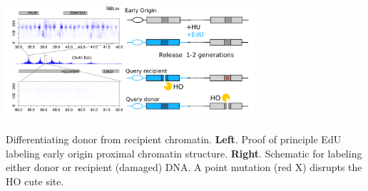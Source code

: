 \begin{floatingfigure}[l]{3.65in}
\vspace{-5mm}
\begin{center}
\includegraphics[width=3.65in]{r35_figures/edu_schematic_27.png}
\end{center}
\vspace{7mm}
\caption{Differentiating donor from recipient chromatin.  \textbf{Left}. Proof of principle EdU labeling early origin proximal chromatin structure.  \textbf{Right}.  Schematic for labeling either donor or recipient (damaged) DNA. A point mutation (red X) disrupts the HO cute site.}%
\end{floatingfigure}






